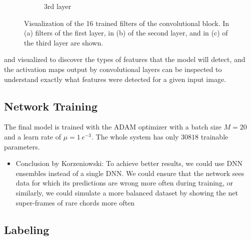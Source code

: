 \documentclass{scrartcl}
\begin{document}
\begin{figure}[htbp]
\begin{subfigure}[b]{0.9\textwidth}
\caption{3rd layer}
\label{fig:3rd_layer}
\end{subfigure}
\caption{Visualization of the 16 trained filters of the convolutional block. In (a) filters of the first layer, in (b) of the second layer, and in (c) of the third layer are shown. }
\label{fig:filter_inspection}
\end{figure}


and visualized to discover the types of features that the model will detect, and the activation maps output by convolutional layers can be inspected to understand exactly what features were detected for a given input image.






\subsection{Network Training}
The final model is trained with the ADAM optimizer \cite{Kingma2014} with a batch size $M = 20$ and a learn rate of $\mu = 1 \,e^{-3}$. The whole system has only $30818$ trainable parameters. 

\begin{itemize}
\item Conclusion by Korzeniowski: To achieve better results, we could use DNN ensembles instead of a single DNN. We could ensure that the network sees data for which its predictions are wrong more often during training, or similarly, we could simulate a more balanced dataset by showing the net super-frames of rare chords more often \cite{Korzeniowski2016}
\end{itemize}


\subsection{Labeling}
\end{document}
